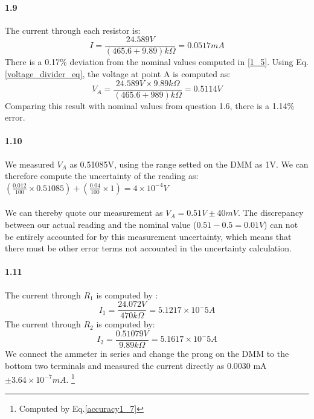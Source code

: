 \documentclass[authoryear, 12pt,5p, times]{elsarticle}
\begin{document}
\paragraph{\textbf{1.9}} 
The current through each resistor is: 
\begin{equation}
I = \frac{24.589V}{(465.6+9.89)k\Omega} = 0.0517mA
\end{equation}
There is a 0.17\% deviation from the nominal values computed in \ref{1_5}.
Using Eq.\ref{voltage_divider_eq}, the voltage at point A is computed as: 
\begin{equation}
V_A= \frac{24.589V \times 9.89k\Omega}{(465.6+989)k\Omega} = 0.5114V
\end{equation}
Comparing this result with nominal values from question 1.6, there is a 1.14\% error.
\paragraph{\textbf{1.10}} 
We measured $V_A$ as 0.51085V, using the range setted on the DMM  as 1V. We can therefore compute the uncertainty of the reading as:
\\
\( (\frac{0.012}{100} \times 0.51085) + (\frac{0.04}{100} \times 1)
 = 4 \times 10^{-4} V  \) \\ \\
We can thereby quote our measurement as \(V_{A} = 0.51V \pm 40mV\). The discrepancy between our actual reading and the nominal value (\( 0.51 - 0.5 = 0.01V \)) can not be entirely accounted for by this measurement uncertainty, which means that there must be other error terms not accounted in the uncertainty calculation.
\paragraph{\textbf{1.11}}
The current through $R_1$ is computed by :
\begin{equation}
I_1 = \frac{24.072V}{ 470k\Omega} = 5.1217\times10^-5A
\end{equation}
The current through $R_2$ is computed by:
\begin{equation}
I_2 = \frac{0.51079V}{ 9.89k\Omega} = 5.1617\times10^-5A
\end{equation}
We connect the ammeter in series and change the prong on the DMM to the bottom two terminals and measured the current directly as 0.0030 mA$\pm 3.64\times10^{-7} mA $.  \footnote{Computed by Eq.\ref{accuracy1_7}}
\end{document}
